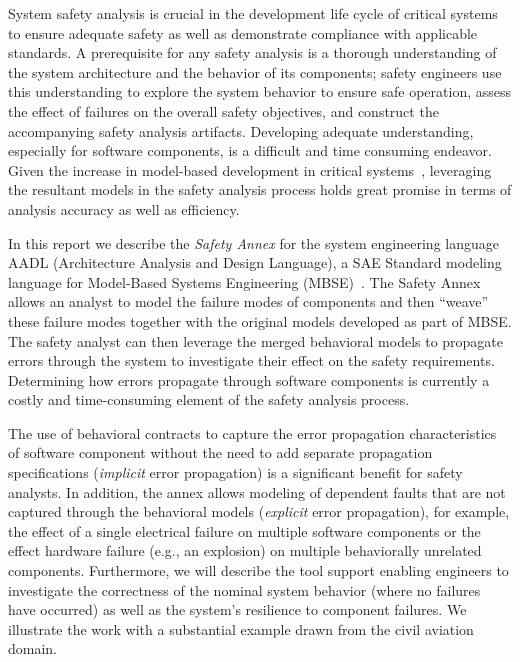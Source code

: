 System safety analysis is crucial in the development life cycle of critical systems to ensure adequate safety as well as demonstrate compliance with applicable standards. A prerequisite for any safety analysis is a thorough understanding of the system architecture and the behavior of its components; safety engineers use this understanding to explore the system behavior to ensure safe operation, assess the effect of failures on the overall safety objectives, and construct the accompanying safety analysis artifacts. Developing adequate understanding, especially for software components, is a difficult and time consuming endeavor. Given the increase in model-based development in critical systems~\cite{Joshi05:Dasc,CAV2015:BoCiGrMa,info17:HaLuHo,5979344,Gudemann:2010:FQQ:1909626.1909813}, leveraging the resultant models in the safety analysis process holds great promise in terms of analysis accuracy as well as efficiency.

In this report we describe the \emph{Safety Annex} for the system engineering language AADL (Architecture Analysis and Design Language), a SAE Standard modeling language for Model-Based Systems Engineering (MBSE)~\cite{AADL_Standard}. The Safety Annex allows an analyst to model the failure modes of components and then ``weave'' these failure modes together with the original models developed as part of MBSE. The safety analyst can then leverage the merged behavioral models to propagate %
errors through the system to investigate their effect on the safety requirements. %
Determining how %
errors propagate through software components is currently a costly and time-consuming element of the safety analysis process. 
\begin{comment} 
The use of behavioral contracts to capture the implicit %
error propagation characteristics of software component is a significant benefit for safety analysts.  
In addition, the annex allows modeling of explicit %
error propagation that is not captured through the behavioral models, for example, the effect of a single electrical failure on multiple software components or the effect hardware failure (e.g., an explosion) on multiple behaviorally unrelated components. 
\end{comment}
The use of behavioral contracts to capture the %
error propagation characteristics of software component without the need to add separate propagation specifications (\emph{implicit} error propagation) is a significant benefit for safety analysts.  
In addition, the annex allows modeling of %
dependent faults that are not captured through the behavioral models (\emph{explicit} error propagation),
for example, the effect of a single electrical failure on multiple software components or the effect hardware failure (e.g., an explosion) on multiple behaviorally unrelated components. 
Furthermore, we will describe the tool support enabling engineers to investigate the correctness of the nominal system behavior (where no failures have occurred) as well as the system's resilience to component failures. We illustrate the work with a substantial example drawn from the civil aviation domain.

